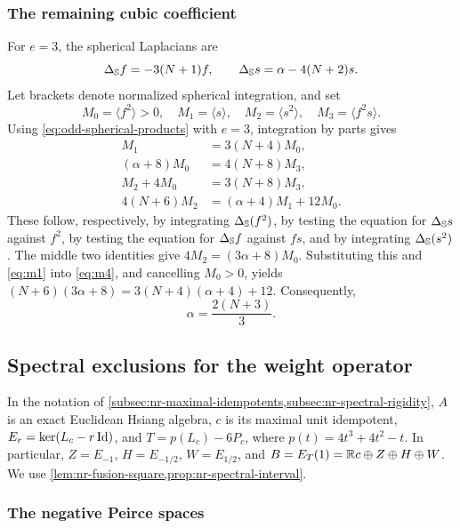 \subsubsection{The remaining cubic coefficient}
For \(e=3\), the spherical Laplacians are
\[
 \Delta_{\mathbb S}f=-3(N+1)f,\qquad
 \Delta_{\mathbb S}s=\alpha-4(N+2)s.
\]
Let brackets denote normalized spherical integration, and set
\[
 M_0=\langle f^2\rangle>0,\quad M_1=\langle s\rangle,
 \quad M_2=\langle s^2\rangle,\quad M_3=\langle f^2s\rangle.
\]
Using \eqref{eq:odd-spherical-products} with \(e=3\), integration
by parts gives
\begin{align}
 M_1&=3(N+4)M_0,\label{eq:m1}\\
 (\alpha+8)M_0&=4(N+8)M_3,\label{eq:m3}\\
 M_2+4M_0&=3(N+8)M_3,\label{eq:m2}\\
 4(N+6)M_2&=(\alpha+4)M_1+12M_0.\label{eq:m4}
\end{align}
These follow, respectively, by integrating
\(\Delta_{\mathbb S}(f^2)\), by testing the equation for
\(\Delta_{\mathbb S}s\) against \(f^2\), by testing the equation for
\(\Delta_{\mathbb S}f\) against \(fs\), and by integrating
\(\Delta_{\mathbb S}(s^2)\).
The middle two identities give
\(4M_2=(3\alpha+8)M_0\). Substituting this and
\eqref{eq:m1} into \eqref{eq:m4}, and cancelling \(M_0>0\), yields \((N+6)(3\alpha+8)=3(N+4)(\alpha+4)+12\).
Consequently,
\begin{equation}\label{eq:alphadim}
 \alpha=\frac{2(N+3)}3.
\end{equation}



\subsection{Spectral exclusions for the weight operator}
\label{app:nr-spectral-exclusions}

In the notation of
\cref{subsec:nr-maximal-idempotents,subsec:nr-spectral-rigidity},
$A$ is an exact Euclidean Hsiang algebra, $c$ is its maximal
unit idempotent, $E_r=\ker(L_c-r\operatorname{Id})$, and
$T=p(L_c)-6P_c$, where $p(t)=4t^3+4t^2-t$.
In particular, $Z=E_{-1}$, $H=E_{-1/2}$, $W=E_{1/2}$, and
$B=E_T(1)=\mathbb R c\oplus Z\oplus H\oplus W$.
We use \cref{lem:nr-fusion-square,prop:nr-spectral-interval}.

\subsubsection{The negative Peirce spaces}

